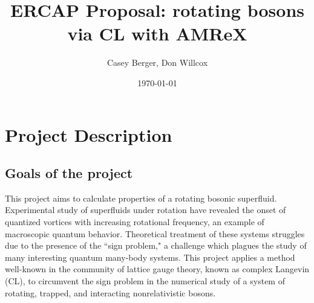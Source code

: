 \documentclass[onecolumn, 12pt]{article}
\title{ERCAP Proposal: rotating bosons via CL with AMReX}
\author{Casey Berger, Don Willcox}
\date{\today}
\begin{document}
\section{Project Description}
	
	
	

	

	
\subsection{Goals of the project}
This project aims to calculate properties of a rotating bosonic superfluid. Experimental study of superfluids under rotation have revealed the onset of quantized vortices with increasing rotational frequency, an example of macroscopic quantum behavior. Theoretical treatment of these systems struggles due to the presence of the ``sign problem," a challenge which plagues the study of many interesting quantum many-body systems. This project applies a method well-known in the community of lattice gauge theory, known as complex Langevin (CL), to circumvent the sign problem in the numerical study of a system of rotating, trapped, and interacting nonrelativistic bosons. 
\end{document}
